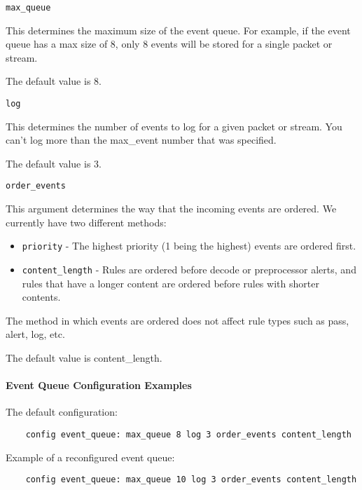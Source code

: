 \documentclass[english]{report}
\newcounter{slistnum}
\newenvironment{slist}
{ \begin{list}{ {\bf \arabic{slistnum}.} }{\usecounter{slistnum} } }
{ \end{list} }
\begin{document}
\begin{slist}
\item \texttt{max\_queue}

This determines the maximum size of the event queue.  For example, if the event
queue has a max size of 8, only 8 events will be stored for a single packet or
stream.

The default value is 8.

\item \texttt{log}

This determines the number of events to log for a given packet or stream.  You
can't log more than the max\_event number that was specified.

The default value is 3.

\item \texttt{order\_events}

This argument determines the way that the incoming events are ordered.  We
currently have two different methods:

\begin{itemize}

\item \texttt{priority} - The highest priority (1 being the highest) events are
ordered first.

\item \texttt{content\_length} - Rules are ordered before decode or
preprocessor alerts, and rules that have a longer content are ordered before
rules with shorter contents.

\end{itemize}

The method in which events are ordered does not affect rule types such as pass,
alert, log, etc.

The default value is content\_length.
\end{slist}

\paragraph{Event Queue Configuration Examples}

The default configuration:

\begin{verbatim}
    config event_queue: max_queue 8 log 3 order_events content_length
\end{verbatim}

Example of a reconfigured event queue:

\begin{verbatim}
    config event_queue: max_queue 10 log 3 order_events content_length
\end{verbatim}
\end{document}
